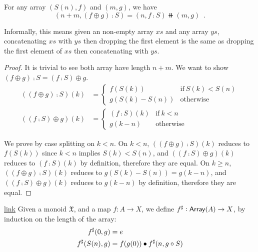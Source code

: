 \begin{lemmarep}\label{array:split}
    For any array $(S(n), f)$ and $(m, g)$, we have
    \[
        (n + m, (f \oplus g) \comp S) = (n, f \comp S) \doubleplus (m, g)
        \enspace .
    \]
\end{lemmarep}

Informally, this means given an non-empty array $xs$ and any array $ys$,
concatenating $xs$ with $ys$ then dropping the first element is the same as
dropping the first element of $xs$ then concatenating with $ys$.

\begin{proof}
    It is trivial to see both array have length $n + m$. We want to show $(f \oplus g) \comp S = (f \comp S) \oplus g$.
    \begin{align*}
        ((f \oplus g) \comp S)(k) & = \begin{cases}
                                          f(S(k))        & \text{if}\ S(k) < S(n) \\
                                          g(S(k) - S(n)) & \text{otherwise}
                                      \end{cases} \\
        ((f \comp S) \oplus g)(k) & = \begin{cases}
                                          (f \comp S)(k) & \text{if}\ k < n \\
                                          g(k - n)       & \text{otherwise}
                                      \end{cases}
    \end{align*}

    We prove by case splitting on $k < n$.
    On $k < n$, $((f \oplus g) \comp S)(k)$ reduces to $f(S(k))$ since $k < n$ implies $S(k) < S(n)$,
    and $((f \comp S) \oplus g)(k)$ reduces to $(f \comp S)(k)$ by definition, therefore they are equal.
    On $k \geq n$, $((f \oplus g) \comp S)(k)$ reduces to $g(S(k) - S(n)) = g(k - n)$,
    and $((f \comp S) \oplus g)(k)$ reduces to $g(k - n)$ by definition, therefore they are equal.
\end{proof}

\begin{definition}{\href{https://windtfw.com/agda-symmetries/Cubical.Structures.Set.Mon.Array.html#16128}{link}}
    Given a monoid $\mathfrak{X}$, and a map $f : A \to X$,
    we define ${f}^{\sharp} : \operatorname{\mathsf{Array}}(A) \to X$, by induction on the length of the array:
    \begin{align*}
        {f}^{\sharp}(0 , g)    & = e                                    \\
        {f}^{\sharp}(S(n) , g) & = f(g(0)) \mathbin{\bullet} {f}^{\sharp}(n , g \circ S)
    \end{align*}
\end{definition}


